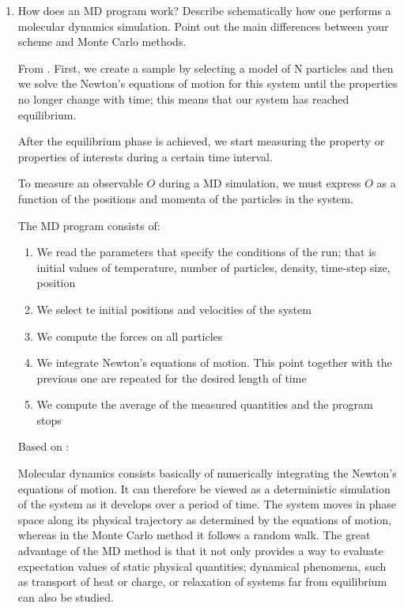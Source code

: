 \documentclass[12pt,letterpaper]{report}
\begin{document}
	\begin{enumerate}
		\item 
		How does an MD program work? Describe schematically how one	performs a molecular dynamics simulation. Point out the main differences between your scheme and Monte Carlo methods. 
		
		From \cite{frenkel2001understanding}. First, we create a sample by selecting a model of N particles and then we solve the Newton's equations of motion for this system until the properties no longer change with time; this means that our system has reached equilibrium. 
		
		After the equilibrium phase is achieved, we start measuring the property or properties of interests during a certain time interval.
		
		To measure an observable $O$ during a MD simulation, we must express $O$ as a function of the positions and momenta of the particles in the system. 
		
		The MD program consists of: 
		\begin{enumerate}[a]
			\item 
			We read the parameters that specify the conditions of the run; that is initial values of temperature, number of particles, density, time-step size, position
			\item 
			We select te initial positions and velocities of the system			
			\item
			We compute the forces on all particles
			\item 		
			We integrate Newton's equations of motion. This point together with the previous one are repeated for the desired length of time
			\item 
			We compute the average of the measured quantities and the program stops			
		\end{enumerate}
		
		Based on \cite{thijssen_2007}: 
		
		Molecular dynamics consists basically of numerically integrating the Newton's equations of motion. It can therefore be viewed as a deterministic simulation of the system as it develops over a period of time. The system moves in phase space along its physical trajectory as determined by the equations of motion, whereas in the Monte Carlo method it follows a random walk. The great advantage of the MD method is that it not only provides a way to evaluate expectation values of static physical quantities; dynamical phenomena, such as transport of heat or charge, or relaxation of systems far from equilibrium can also be studied.
		

\end{enumerate}
\end{document}
